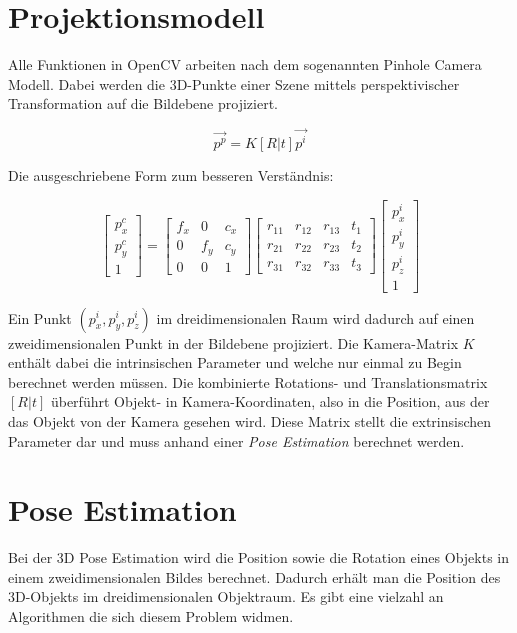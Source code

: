 \section{Projektionsmodell}
\label{sec:projektionsmodell}

Alle Funktionen in OpenCV arbeiten nach dem sogenannten Pinhole Camera Modell. Dabei werden die 3D-Punkte einer Szene mittels perspektivischer Transformation auf die Bildebene projiziert.

\begin{equation}
\vec{p^p} = K [R|t] \vec{p^i}
\end{equation}

Die ausgeschriebene Form zum besseren Verständnis:

\begin{equation}
\begin{bmatrix}	
p^c_x \\ p^c_y \\ 1
\end{bmatrix} 
=
\begin{bmatrix}
f_x & 0 & c_x \\
0 & f_y & c_y \\
0 & 0 & 1
\end{bmatrix} 
\begin{bmatrix}
r_{11} & r_{12} & r_{13} & t_1 \\
r_{21} & r_{22} & r_{23} & t_2 \\
r_{31} & r_{32} & r_{33} & t_3
\end{bmatrix} 
\begin{bmatrix}
p^i_x \\ p^i_y \\ p^i_z \\ 1
\end{bmatrix} 
\end{equation}

Ein Punkt $(p^i_x, p^i_y, p^i_z)$ im dreidimensionalen Raum wird dadurch auf einen zweidimensionalen Punkt in der Bildebene projiziert. Die Kamera-Matrix $K$ enthält dabei die intrinsischen Parameter und welche nur einmal zu Begin berechnet werden müssen. Die kombinierte Rotations- und Translationsmatrix $[R|t]$ überführt Objekt- in Kamera-Koordinaten, also in die Position, aus der das Objekt von der Kamera gesehen wird. Diese Matrix stellt die extrinsischen Parameter dar und muss anhand einer \textit{Pose Estimation} berechnet werden.

\section{Pose Estimation}
Bei der 3D Pose Estimation wird die Position sowie die Rotation eines Objekts in einem zweidimensionalen Bildes berechnet. Dadurch erhält man die Position des 3D-Objekts im dreidimensionalen Objektraum. Es gibt eine vielzahl an Algorithmen die sich diesem Problem widmen.

